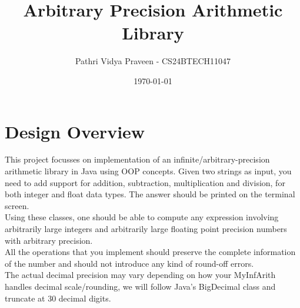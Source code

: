 \documentclass{article}
\title{Arbitrary Precision Arithmetic Library}
\author{Pathri Vidya Praveen - CS24BTECH11047}
\date{\today}
\begin{document}
\maketitle

\tableofcontents
\newpage

\section{Design Overview}

This project focusses on implementation of an  infinite/arbitrary-precision arithmetic library in Java using OOP concepts. Given two strings as input, you need to add support for addition, subtraction, multiplication and division, for both integer and float data types. The answer should be printed on the terminal screen.\\
Using these classes, one should be able to compute any expression involving arbitrarily large integers and arbitrarily large floating point precision numbers with arbitrary precision. \\
All the operations that you implement should preserve the complete information of the number and should not introduce any kind of round-off errors.\\
The actual decimal precision may vary depending on how your MyInfArith handles decimal scale/rounding, we will follow Java’s BigDecimal class and truncate at 30 decimal digits.\\
\end{document}
